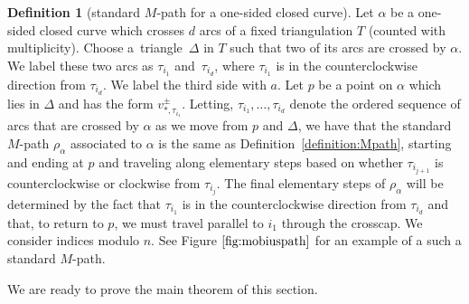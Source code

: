 \documentclass[pdftex]{sigma}
\numberwithin{equation}{section}
\theoremstyle{definition}
\newtheorem{Definition}[Theorem]{Definition}
\begin{document}
\begin{Definition}[standard $M$-path for a one-sided closed curve]\label{definition:Mpath2}
Let $\alpha$ be a one-sided closed curve which crosses $d$ arcs of a fixed triangulation $T$ (counted with multiplicity). Choose a~triangle~$\Delta$ in $T$ such that two of its arcs are crossed by $\alpha$. We label these two arcs as $\tau_{i_1}$ and~$\tau_{i_d}$, where $\tau_{i_1}$ is in the counterclockwise direction from $\tau_{i_d}$. We label the third side with $a$. Let $p$ be a point on $\alpha$ which lies in $\Delta$ and has the form $v_{*, \tau_{i_1}}^{\pm}$. Letting, $\tau_{i_1},\ldots, \tau_{i_d}$ denote the ordered sequence of arcs that are crossed by $\alpha$ as we move from $p$ and $\Delta$, we have that the standard $M$-path $\rho_{\alpha}$ associated to $\alpha$ is the same as Definition~\ref{definition:Mpath}, starting and ending at $p$ and traveling along elementary steps based on whether $\tau_{i_{j+1}}$ is counterclockwise or clockwise from $\tau_{i_j}$. The final elementary steps of $\rho_{\alpha}$ will be determined by the fact that $\tau_{i_1}$ is in the counterclockwise direction from $\tau_{i_d}$ and that, to return to $p$, we must travel parallel to $i_1$ through the crosscap. We consider indices modulo $n$. See Figure $\ref{fig:mobiuspath}$ for an example of a such a standard $M$-path.
\end{Definition}

We are ready to prove the main theorem of this section.
\end{document}
